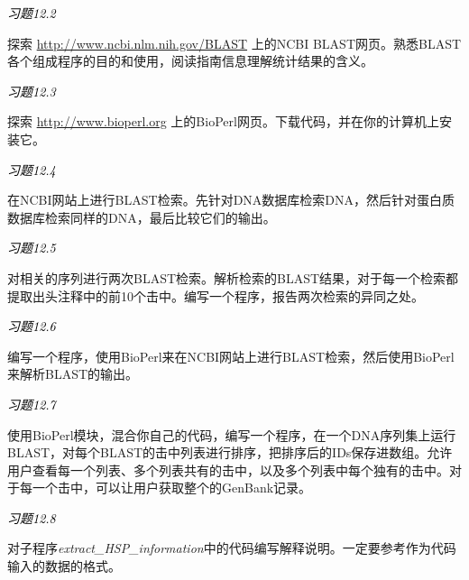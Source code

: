 \textcolor{black}{\textit{习题12.2}}
\begin{adjustwidth}{4em}{}
探索 \href{http://www.ncbi.nlm.nih.gov/BLAST}{http://www.ncbi.nlm.nih.gov/BLAST} 上的NCBI BLAST网页。熟悉BLAST各个组成程序的目的和使用，阅读指南信息理解统计结果的含义。
\end{adjustwidth}

\textcolor{black}{\textit{习题12.3}}
\begin{adjustwidth}{4em}{}
探索 \href{http://www.bioperl.org}{http://www.bioperl.org} 上的BioPerl网页。下载代码，并在你的计算机上安装它。
\end{adjustwidth}

\textcolor{black}{\textit{习题12.4}}
\begin{adjustwidth}{4em}{}
在NCBI网站上进行BLAST检索。先针对DNA数据库检索DNA，然后针对蛋白质数据库检索同样的DNA，最后比较它们的输出。
\end{adjustwidth}

\textcolor{black}{\textit{习题12.5}}
\begin{adjustwidth}{4em}{}
对相关的序列进行两次BLAST检索。解析检索的BLAST结果，对于每一个检索都提取出头注释中的前10个击中。编写一个程序，报告两次检索的异同之处。
\end{adjustwidth}

\textcolor{black}{\textit{习题12.6}}
\begin{adjustwidth}{4em}{}
编写一个程序，使用BioPerl来在NCBI网站上进行BLAST检索，然后使用BioPerl来解析BLAST的输出。
\end{adjustwidth}

\textcolor{black}{\textit{习题12.7}}
\begin{adjustwidth}{4em}{}
使用BioPerl模块，混合你自己的代码，编写一个程序，在一个DNA序列集上运行BLAST，对每个BLAST的击中列表进行排序，把排序后的IDs保存进数组。允许用户查看每一个列表、多个列表共有的击中，以及多个列表中每个独有的击中。对于每一个击中，可以让用户获取整个的GenBank记录。
\end{adjustwidth}

\textcolor{black}{\textit{习题12.8}}
\begin{adjustwidth}{4em}{}
对子程序\textit{extract\_HSP\_information}中的代码编写解释说明。一定要参考作为代码输入的数据的格式。
\end{adjustwidth}

